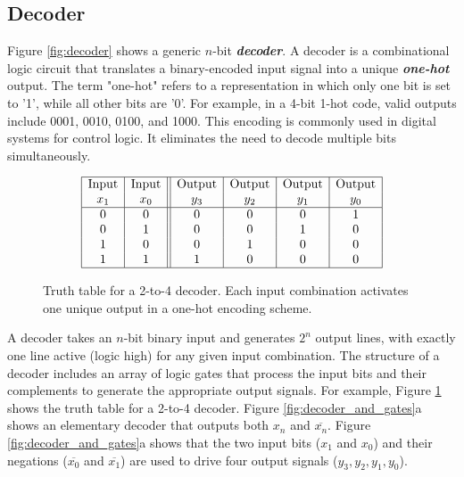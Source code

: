 
\subsection{Decoder}
Figure \ref{fig:decoder} shows a generic $n$-bit {\bf {\em decoder}}. A decoder is a combinational logic circuit that translates a binary-encoded input signal into a unique {\bf {\em one-hot}} output. The term "one-hot" refers to a representation in which only one bit is set to '1', while all other bits are '0'. For example, in a 4-bit 1-hot code, valid outputs include 0001, 0010, 0100, and 1000. This encoding is commonly used in digital systems for control logic. It eliminates the need to decode multiple bits simultaneously. 

\begin{figure}[h!]
\centering
\[
\begin{array}{|c|c||c|c|c|c|}
\hline
\text{Input} & \text{Input} & \text{Output} & \text{Output} & \text{Output} & \text{Output} \\
x_1 & x_0 &  y_3 &  y_2 & y_1 & y_0 \\
\hline
0 & 0 & 0 & 0 & 0 & 1 \\
0 & 1 & 0 & 0 & 1 & 0 \\
1 & 0 & 0 & 1 & 0 & 0 \\
1 & 1 & 1 & 0 & 0 & 0 \\
\hline
\end{array}
\]
\caption{Truth table for a 2-to-4 decoder. Each input combination activates one unique output in a one-hot encoding scheme.}
\label{fig:decoder_truth_table}
\end{figure}


A decoder takes an \(n\)-bit binary input and generates \(2^n\) output lines, with exactly one line active (logic high) for any given input combination. The structure of a decoder includes an array of logic gates that process the input bits and their complements to generate the appropriate output signals. For example, Figure \ref{fig:decoder_truth_table} shows the truth table for a 2-to-4 decoder. Figure \ref{fig:decoder_and_gates}a shows an elementary decoder that outputs both $x_n$ and $\overline{x_n}$. Figure \ref{fig:decoder_and_gates}a shows that the two input bits (\(x_1\) and \(x_0\)) and their negations (\(\overline{x_0}\) and \(\overline{x_1}\)) are used to drive four output signals (\(y_3, y_2, y_1, y_0\)). 



